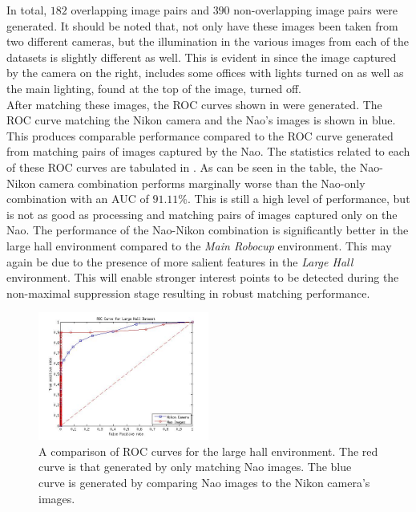 \documentclass{report}
\begin{document}
In total, $182$ overlapping image pairs and $390$ non-overlapping image pairs were generated. It should be noted that, not only have these images been taken from two different cameras, but the illumination in the various images from each of the datasets is slightly different as well. This is evident in   since the image captured by the camera on the right, includes some offices with lights turned on as well as the main lighting, found at the top of the image, turned off. \\

After matching these images, the ROC curves shown in  were generated. The ROC curve matching the Nikon camera and the Nao's images is shown in blue. This produces comparable performance compared to the ROC curve generated from matching pairs of images captured by the Nao. The statistics related to each of these ROC curves are tabulated in . As can be seen in the table, the Nao-Nikon camera combination performs marginally worse than the Nao-only combination with an AUC of $91.11\%$. This is still a high level of performance, but is not as good as processing and matching pairs of images captured only on the Nao. The performance of the Nao-Nikon combination is significantly better in the large hall environment compared to the \textit{Main Robocup} environment. This may again be due to the presence of more salient features in the \textit{Large Hall} environment. This will enable stronger interest points to be detected during the non-maximal suppression stage resulting in robust matching performance.\\ 


 \begin{figure}[h!] 
  \centering
    \includegraphics[width=0.5\textwidth]{../Drawings/camera/ROC_dataset3.jpg}
    \caption{A comparison of ROC curves for the large hall environment. The red curve is that generated by only matching Nao images. The blue curve is generated by comparing Nao images to the Nikon camera's images. }
    \label{fig:rocLargeHallNikon}
\end{figure}
\end{document}
